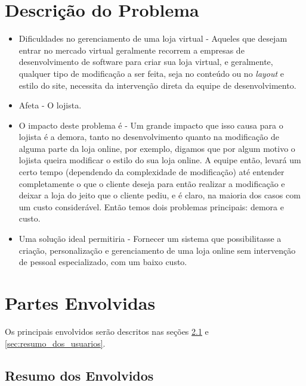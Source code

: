 \documentclass[a4paper,12pt]{monografia}
\begin{document}

\section{Descrição do Problema} %
\label{cha:descricao_do_problema}

\begin{itemize}
\item Dificuldades no gerenciamento de uma loja virtual - 
Aqueles que desejam entrar no mercado virtual geralmente recorrem a empresas de desenvolvimento de software para criar sua loja virtual, e geralmente, qualquer tipo de modificação a ser feita, seja no conteúdo ou no \textit{layout} e estilo do site, necessita da intervenção direta da equipe de desenvolvimento.

\item Afeta - O lojista.
\item O impacto deste problema é - 
Um grande impacto que isso causa para o lojista é a demora, tanto no desenvolvimento quanto na modificação de alguma parte da loja online, por exemplo, digamos que por algum motivo o lojista queira modificar o estilo do sua loja online. A equipe então, levará um certo tempo (dependendo da complexidade de modificação) até entender completamente o que o cliente deseja para então realizar a modificação e deixar a loja do jeito que o cliente pediu, e é claro, na maioria dos casos com um custo considerável. Então temos dois problemas principais: demora e custo.

\item Uma solução ideal permitiria - 
Fornecer um sistema que possibilitasse a criação, personalização  e gerenciamento de uma loja online sem intervenção de pessoal especializado, com um baixo custo.

\end{itemize}


\section{Partes Envolvidas} %
\label{sec:partes_envolvidas}

Os principais envolvidos serão descritos nas seções \ref{sec:resumo_dos_envolvidos} e \ref{sec:resumo_dos_usuarios}.

\subsection{Resumo dos Envolvidos} %
\label{sec:resumo_dos_envolvidos}
\end{document}
